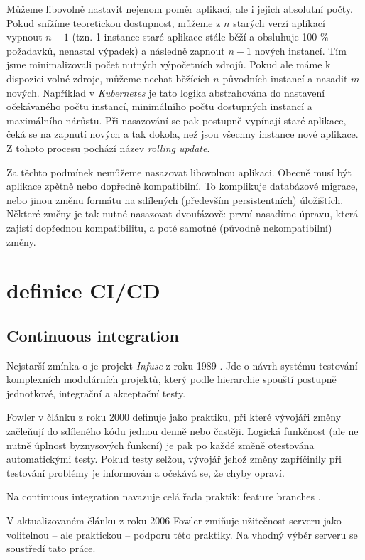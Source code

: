             Můžeme libovolně nastavit nejenom poměr aplikací, ale i jejich absolutní počty. Pokud snížíme teoretickou dostupnost, můžeme z $n$ starých verzí aplikací vypnout $n-1$ (tzn. 1 instance staré aplikace stále běží a obsluhuje 100 \% požadavků, nenastal výpadek) a následně zapnout $n-1$ nových instancí. Tím jsme minimalizovali počet nutných výpočetních zdrojů. Pokud ale máme k dispozici volné zdroje, můžeme nechat běžících $n$ původních instancí a nasadit $m$ nových. Například v \textit{Kubernetes} je tato logika abstrahována do nastavení očekávaného počtu instancí, minimálního počtu dostupných instancí a maximálního nárůstu. Při nasazování se pak postupně vypínají staré aplikace, čeká se na zapnutí nových a tak dokola, než jsou všechny instance nové aplikace. Z tohoto procesu pochází název \textit{rolling update}.

            Za těchto podmínek nemůžeme nasazovat libovolnou aplikaci. Obecně musí být aplikace zpětně nebo dopředně kompatibilní. To komplikuje databázové migrace, nebo jinou změnu formátu na sdílených (především persistentních) úložištích. Některé změny je tak nutné nasazovat dvoufázově: první nasadíme úpravu, která zajistí dopřednou kompatibilitu, a poté samotné (původně nekompatibilní) změny.


    \section{definice CI/CD}
        \subsection{Continuous integration}
            Nejstarší zmínka o \CI je projekt \textit{Infuse} z roku 1989 \cite{kaiser-infuse}. Jde o návrh systému testování komplexních modulárních projektů, který podle hierarchie spouští postupně jednotkové, integrační a akceptační testy.

            Fowler v článku z roku 2000 \cite{fowler-ci-original} definuje \CI jako praktiku, při které vývojáři změny začleňují do sdíleného kódu jednou denně nebo častěji. Logická funkčnost (ale ne nutně úplnost byznysových funkcní) je pak po každé změně otestována automatickými testy. Pokud testy selžou, vývojář jehož změny zapříčinily při testování problémy je informován a očekává se, že chyby opraví.

            Na continuous integration navazuje celá řada praktik: feature branches .

            V aktualizovaném článku z roku 2006 Fowler \cite{fowler-ci} zmiňuje užitečnost \CI serveru jako volitelnou -- ale praktickou -- podporu této praktiky. Na vhodný výběr \CI serveru se soustředí tato práce.

